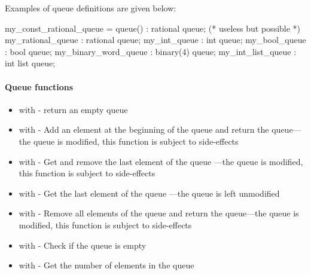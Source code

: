 Examples of queue definitions are given below:

\begin{IMITATORmodel}
	my_const_rational_queue = queue() : rational queue; (* useless but possible *)
	my_rational_queue			: rational queue;
	my_int_queue					: int queue;
	my_bool_queue        	: bool queue;
	my_binary_word_queue 	: binary(4) queue;
	my_int_list_queue     : int list queue;
\end{IMITATORmodel}


\paragraph{Queue functions}

\begin{itemize}
	\item {} with  - return an empty queue
	\item \label{item:lbl-queue_push}  with  - Add an element  at the beginning of the queue  and return the queue---the queue is modified, this function is subject to side-effects
	\item \label{item:lbl-queue_pop}  with  - Get and remove the last element of the queue ---the queue is modified, this function is subject to side-effects
	\item \label{item:lbl-queue_top}  with  - Get the last element of the queue ---the queue is left unmodified
	\item \label{item:lbl-queue_clear}  with  - Remove all elements of the queue  and return the queue---the queue is modified, this function is subject to side-effects
	\item \label{item:lbl-queue_is_empty}  with  - Check if the queue  is empty
	\item \label{item:lbl-queue_length}  with  - Get the number of elements in the queue 
\end{itemize}

